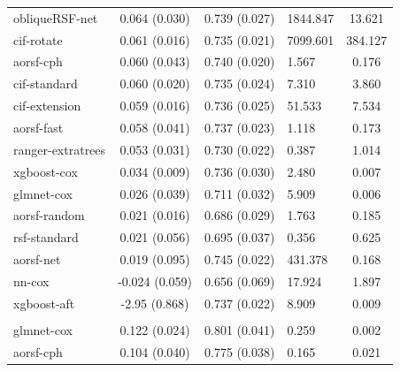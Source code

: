 \documentclass[twoside,11pt]{article}\usepackage[]{graphicx}\usepackage[]{xcolor}
\newenvironment{knitrout}{}{} %
\begin{document}
\begin{knitrout}
\begin{longtable}[t]{lcclc}
\hline
\hspace{1em}obliqueRSF-net & 0.064 (0.030) & 0.739 (0.027) & 1844.847 & 13.621\\
\hspace{1em}cif-rotate & 0.061 (0.016) & 0.735 (0.021) & 7099.601 & 384.127\\
\hspace{1em}aorsf-cph & 0.060 (0.043) & 0.740 (0.020) & 1.567 & 0.176\\
\hspace{1em}cif-standard & 0.060 (0.020) & 0.735 (0.024) & 7.310 & 3.860\\
\hspace{1em}cif-extension & 0.059 (0.016) & 0.736 (0.025) & 51.533 & 7.534\\
\hspace{1em}aorsf-fast & 0.058 (0.041) & 0.737 (0.023) & 1.118 & 0.173\\
\hspace{1em}ranger-extratrees & 0.053 (0.031) & 0.730 (0.022) & 0.387 & 1.014\\
\hspace{1em}xgboost-cox & 0.034 (0.009) & 0.736 (0.030) & 2.480 & 0.007\\
\hspace{1em}glmnet-cox & 0.026 (0.039) & 0.711 (0.032) & 5.909 & 0.006\\
\hspace{1em}aorsf-random & 0.021 (0.016) & 0.686 (0.029) & 1.763 & 0.185\\
\hspace{1em}rsf-standard & 0.021 (0.056) & 0.695 (0.037) & 0.356 & 0.625\\
\hspace{1em}aorsf-net & 0.019 (0.095) & 0.745 (0.022) & 431.378 & 0.168\\
\hspace{1em}nn-cox & -0.024 (0.059) & 0.656 (0.069) & 17.924 & 1.897\\
\hspace{1em}xgboost-aft & -2.95 (0.868) & 0.737 (0.022) & 8.909 & 0.009\\
\addlinespace[0.3em]
\hline
\multicolumn{5}{l}{\textit{\textbf{FCL; death, n = 541, p = 7}}}\\
\hline
\hspace{1em}glmnet-cox & 0.122 (0.024) & 0.801 (0.041) & 0.259 & 0.002\\
\hspace{1em}aorsf-cph & 0.104 (0.040) & 0.775 (0.038) & 0.165 & 0.021\\

\end{longtable}
\end{knitrout}
\end{document}
